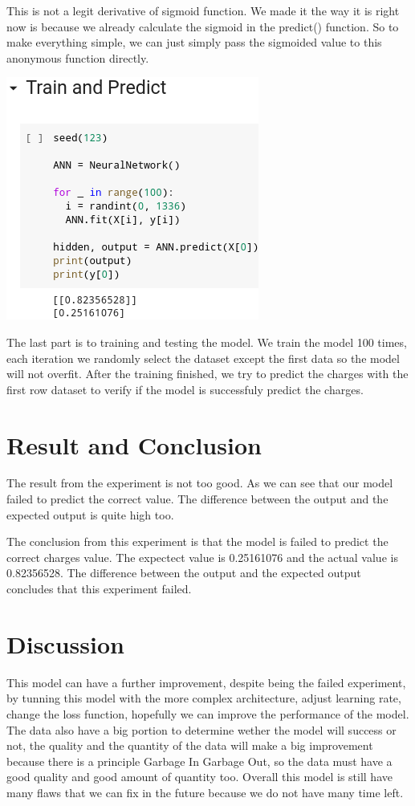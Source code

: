 \documentclass[a4paper, 12pt]{article}
\begin{document}
\begin{multicols}{2}
\justifying
This is not a legit derivative of sigmoid function. We made it the way it is right now is because we already calculate the sigmoid in the predict() function. So to make everything simple, we can just simply pass the sigmoided value to this anonymous function directly.

\centering
\vspace{0.2cm}
\includegraphics[scale=0.55]{nn_8}
\vspace{0.2cm}

\justifying
The last part is to training and testing the model. We train the model 100 times, each iteration we randomly select the dataset except the first data so the model will not overfit. After the training finished, we try to predict the charges with the first row dataset to verify if the model is successfuly predict the charges.

\section{Result and Conclusion}
The result from the experiment is not too good. As we can see that our model failed to predict the correct value. The difference between the output and the expected output is quite high too.

The conclusion from this experiment is that the model is failed to predict the correct charges value. The expectect value is 0.25161076 and the actual value is 0.82356528. The difference between the output and the expected output concludes that this experiment failed.
\section{Discussion}
This model can have a further improvement, despite being the failed experiment, by tunning this model with the more complex architecture, adjust learning rate, change the loss function, hopefully we can improve the performance of the model. The data also have a big portion to determine wether the model will success or not, the quality and the quantity of the data will make a big improvement because there is a principle Garbage In Garbage Out, so the data must have a good quality and good
amount of quantity too. Overall this model is still have many flaws that we can fix in the future because we do not have many time left.

\end{multicols}
\newpage
\centering
\printbibliography
\end{document}
